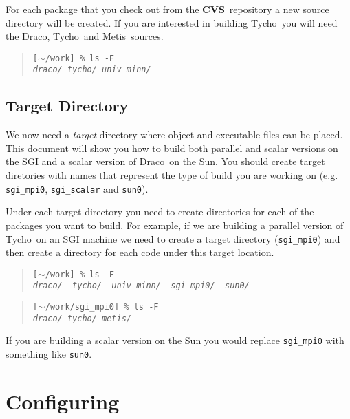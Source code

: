 \documentclass[11pt]{nmemo}
\newcommand{\comp}[1]{\normalfont\normalsize\texttt{#1}}
\newcommand{\draco}{{\normalfont\sffamily Draco}}
\newcommand{\tycho}{{\normalfont\sffamily Tycho}}
\newcommand{\metis}{{\normalfont\sffamily Metis}}
\newcommand{\cvs}{{\normalfont\bfseries CVS}}
\begin{document}
For each package that you check out from the \cvs\ repository a new
source directory will be created.  If you are interested in building
\tycho\ you will need the \draco, \tycho\ and \metis\ sources.

\begin{verse}
\texttt{[$\sim$/work] \% ls -F \\
\emph{draco/  tycho/  univ\_minn/}}
\end{verse}

\subsection{Target Directory}

We now need a \emph{target} directory where object and executable
files can be placed.  This document will show you how to build both
parallel and scalar versions on the SGI and a scalar version of
\draco\ on the Sun.  You should create target diretories with names
that represent the type of build you are working on
(e.g. \comp{sgi\_mpi0}, \comp{sgi\_scalar} and \comp{sun0}).

Under each target directory you need to create directories for each of
the packages you want to build.  For example, if we are building a
parallel version of \tycho\ on an SGI machine we need to create a
target directory (\comp{sgi\_mpi0}) and then create a directory for
each code under this target location.

\begin{verse}
\texttt{[$\sim$/work] \% ls -F \\
\emph{draco/\ \ tycho/\ \ univ\_minn/\ \ sgi\_mpi0/\ \ sun0/ }}
\end{verse}

\begin{verse}
\texttt{[$\sim$/work/sgi\_mpi0] \% ls -F \\
\emph{draco/  tycho/  metis/}}
\end{verse}

If you are building a scalar version on the Sun you would replace
\comp{sgi\_mpi0} with something like \comp{sun0}.


\section{Configuring}
\label{configure}
\end{document}
